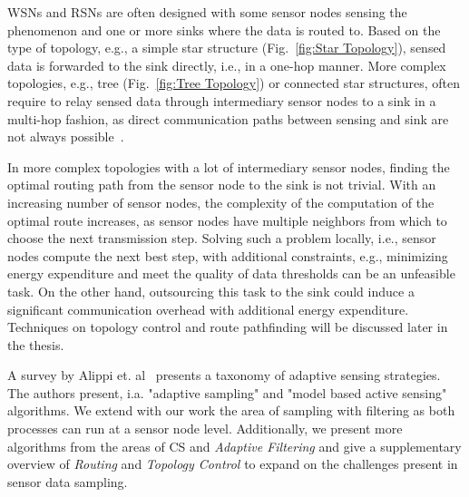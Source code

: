 \par
\acp{WSN} and \acp{RSN} are often designed with some sensor nodes sensing the
phenomenon and one or more sinks where the data is routed to. Based on the type
of topology, e.g., a simple star structure (Fig.~\ref{fig:Star Topology}),
sensed data is forwarded to the sink directly, i.e., in a one-hop manner. More
complex topologies, e.g., tree (Fig.~\ref{fig:Tree Topology}) or connected star
structures, often require to relay sensed data through intermediary sensor
nodes to a sink in a multi-hop fashion, as direct communication paths between
sensing and sink are not always possible~\cite{romer2004design}. 
\par
In more complex topologies with a lot of intermediary sensor nodes, finding the
optimal routing path from the sensor node to the sink is not trivial. With an
increasing number of sensor nodes, the complexity of the computation of the
optimal route increases, as sensor nodes have multiple neighbors from which to
choose the next transmission step. Solving such a problem locally, i.e., sensor
nodes compute the next best step, with additional constraints, e.g., minimizing
energy expenditure and meet the quality of data thresholds can be an unfeasible
task. On the other hand, outsourcing this task to the sink could induce a
significant communication overhead with additional energy expenditure.
Techniques on topology control and route pathfinding will be discussed later in
the thesis.
\par
A survey by Alippi et. al~\cite{alippi2009energy} presents a taxonomy of
adaptive sensing strategies. The authors present, i.a. "adaptive sampling" and
"model based active sensing" algorithms. We extend with our work the area of
sampling with filtering as both processes can run at a sensor node level.
Additionally, we present more algorithms from the areas of \ac{CS} and
\textit{Adaptive Filtering} and give a supplementary overview of
\textit{Routing} and \textit{Topology Control} to expand on the challenges
present in sensor data sampling.

